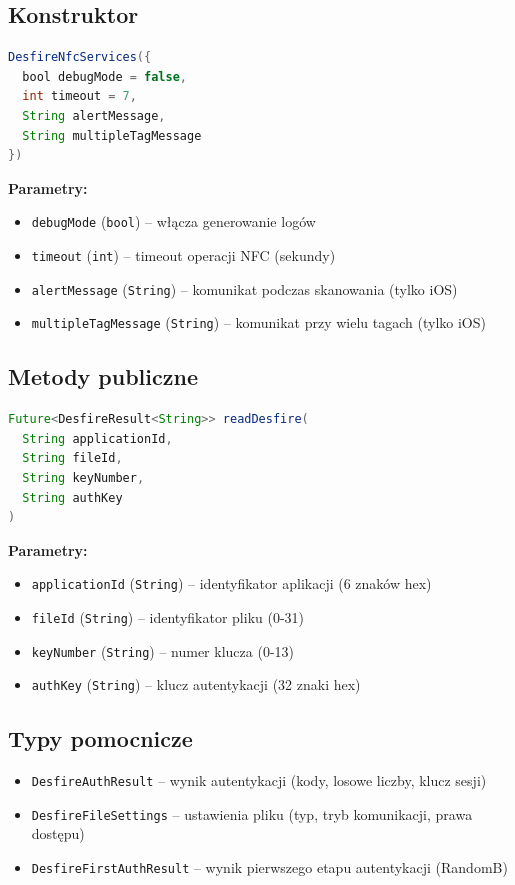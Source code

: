 \documentclass[a4paper,12pt]{article}
\begin{document}
\subsection{Konstruktor}
\begin{lstlisting}[language=Java]
DesfireNfcServices({
  bool debugMode = false, 
  int timeout = 7, 
  String alertMessage, 
  String multipleTagMessage
})
\end{lstlisting}

\textbf{Parametry:}
    \begin{itemize}
        \item \texttt{debugMode} (\texttt{bool}) -- włącza generowanie logów
        \item \texttt{timeout} (\texttt{int}) -- timeout operacji NFC (sekundy)
        \item \texttt{alertMessage} (\texttt{String}) -- komunikat podczas skanowania (tylko iOS)
        \item \texttt{multipleTagMessage} (\texttt{String}) -- komunikat przy wielu tagach (tylko iOS)
\end{itemize}

\subsection{Metody publiczne}
\begin{lstlisting}[language=Java]
Future<DesfireResult<String>> readDesfire(
  String applicationId, 
  String fileId, 
  String keyNumber, 
  String authKey
)
\end{lstlisting}

\textbf{Parametry:}
    \begin{itemize}
        \item \texttt{applicationId} (\texttt{String}) -- identyfikator aplikacji (6 znaków hex)
        \item \texttt{fileId} (\texttt{String}) -- identyfikator pliku (0-31)
        \item \texttt{keyNumber} (\texttt{String}) -- numer klucza (0-13)
        \item \texttt{authKey} (\texttt{String}) -- klucz autentykacji (32 znaki hex)
    \end{itemize}

\subsection{Typy pomocnicze}
\begin{itemize}
    \item \texttt{DesfireAuthResult} -- wynik autentykacji (kody, losowe liczby, klucz sesji)
    \item \texttt{DesfireFileSettings} -- ustawienia pliku (typ, tryb komunikacji, prawa dostępu)
    \item \texttt{DesfireFirstAuthResult} -- wynik pierwszego etapu autentykacji (RandomB)
\end{itemize}
\end{document}
